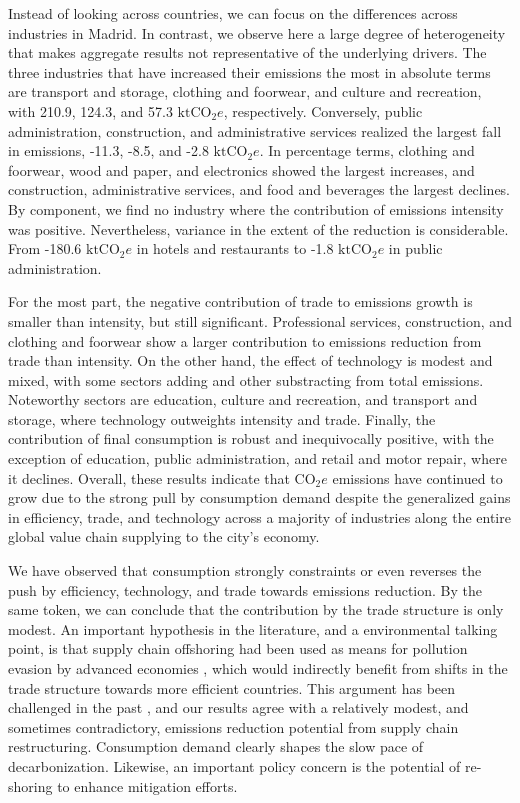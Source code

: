 \documentclass[
  10pt,
  twocolumn]{aft}
\begin{document}
Instead of looking across countries, we can focus on the differences
across industries in Madrid. In contrast, we observe here a large degree
of heterogeneity that makes aggregate results not representative of the
underlying drivers. The three industries that have increased their
emissions the most in absolute terms are transport and storage, clothing
and foorwear, and culture and recreation, with 210.9, 124.3, and 57.3
\(\text{ktCO}_2e\), respectively. Conversely, public administration,
construction, and administrative services realized the largest fall in
emissions, -11.3, -8.5, and -2.8 \(\text{ktCO}_2e\). In percentage
terms, clothing and foorwear, wood and paper, and electronics showed the
largest increases, and construction, administrative services, and food
and beverages the largest declines. By component, we find no industry
where the contribution of emissions intensity was positive.
Nevertheless, variance in the extent of the reduction is considerable.
From -180.6 \(\text{ktCO}_2e\) in hotels and restaurants to -1.8
\(\text{ktCO}_2e\) in public administration.

For the most part, the negative contribution of trade to emissions
growth is smaller than intensity, but still significant. Professional
services, construction, and clothing and foorwear show a larger
contribution to emissions reduction from trade than intensity. On the
other hand, the effect of technology is modest and mixed, with some
sectors adding and other substracting from total emissions. Noteworthy
sectors are education, culture and recreation, and transport and
storage, where technology outweights intensity and trade. Finally, the
contribution of final consumption is robust and inequivocally positive,
with the exception of education, public administration, and retail and
motor repair, where it declines. Overall, these results indicate that
\(\text{CO}_2e\) emissions have continued to grow due to the strong pull
by consumption demand despite the generalized gains in efficiency,
trade, and technology across a majority of industries along the entire
global value chain supplying to the city's economy.

We have observed that consumption strongly constraints or even reverses
the push by efficiency, technology, and trade towards emissions
reduction. By the same token, we can conclude that the contribution by
the trade structure is only modest. An important hypothesis in the
literature, and a environmental talking point, is that supply chain
offshoring had been used as means for pollution evasion by advanced
economies \citep{levinsonUnmaskingPollutionHave2008}, which would
indirectly benefit from shifts in the trade structure towards more
efficient countries. This argument has been challenged in the past
\citep{artoDriversGrowthGlobal2014}, and our results agree with a
relatively modest, and sometimes contradictory, emissions reduction
potential from supply chain restructuring. Consumption demand clearly
shapes the slow pace of decarbonization. Likewise, an important policy
concern is the potential of re-shoring to enhance mitigation efforts.
\end{document}
